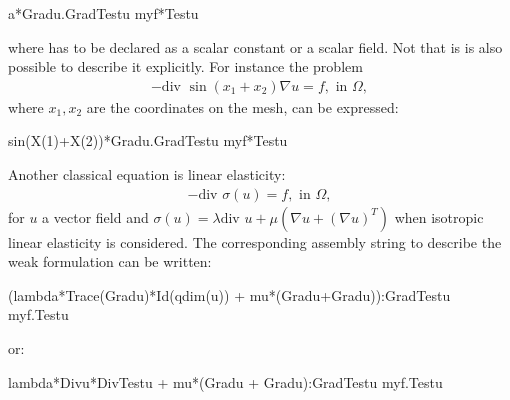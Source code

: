 \documentclass[a4paper,11pt,english]{sphinxmanual}
\begin{document}
\begin{sphinxVerbatim}[commandchars=\\\{\}]
a*Grad\PYGZus{}u.Grad\PYGZus{}Test\PYGZus{}u \PYGZhy{} my\PYGZus{}f*Test\PYGZus{}u
\end{sphinxVerbatim}

where  has to be declared as a scalar constant or a scalar field. Not that is is also possible to describe it explicitly. For instance the problem
\begin{equation*}
\begin{split}-\mbox{div } \sin(x_1+x_2)\nabla u = f, \mbox{ in } \Omega,\end{split}
\end{equation*}
where \(x_1, x_2\) are the coordinates on the mesh, can be expressed:

\begin{sphinxVerbatim}[commandchars=\\\{\}]
sin(X(1)+X(2))*Grad\PYGZus{}u.Grad\PYGZus{}Test\PYGZus{}u \PYGZhy{} my\PYGZus{}f*Test\PYGZus{}u
\end{sphinxVerbatim}

Another classical equation is linear elasticity:
\begin{equation*}
\begin{split}-\mbox{div } \sigma(u) = f, \mbox{ in } \Omega,\end{split}
\end{equation*}
for \(u\) a vector field and \(\sigma(u) = \lambda \mbox{div } u + \mu (\nabla u + (\nabla u)^T)\) when isotropic linear elasticity is considered. The corresponding assembly string to describe the weak formulation can be written:

\begin{sphinxVerbatim}[commandchars=\\\{\}]
\PYGZdq{}(lambda*Trace(Grad\PYGZus{}u)*Id(qdim(u)) + mu*(Grad\PYGZus{}u+Grad\PYGZus{}u\PYGZsq{})):Grad\PYGZus{}Test\PYGZus{}u \PYGZhy{} my\PYGZus{}f.Test\PYGZus{}u\PYGZdq{}
\end{sphinxVerbatim}

or:

\begin{sphinxVerbatim}[commandchars=\\\{\}]
\PYGZdq{}lambda*Div\PYGZus{}u*Div\PYGZus{}Test\PYGZus{}u + mu*(Grad\PYGZus{}u + Grad\PYGZus{}u\PYGZsq{}):Grad\PYGZus{}Test\PYGZus{}u \PYGZhy{} my\PYGZus{}f.Test\PYGZus{}u\PYGZdq{}
\end{sphinxVerbatim}
\end{document}
